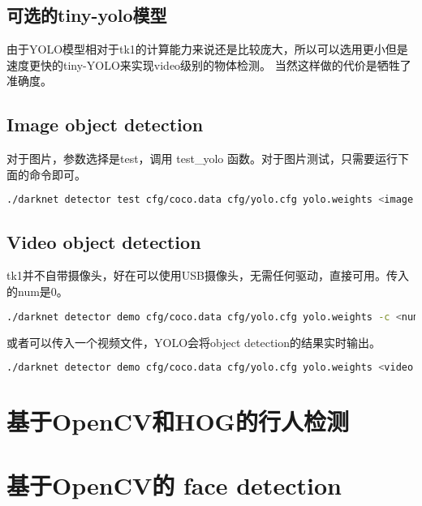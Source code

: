 \documentclass[openany]{ctexbook}
\newcommand{\info}[1] {\fcolorbox{blue!20}{blue!20} {\color{blue} #1}}
\begin{document}
\subsection{可选的tiny-yolo模型}
由于YOLO模型相对于tk1的计算能力来说还是比较庞大，所以可以选用更小但是速度更快的tiny-YOLO来实现video级别的物体检测。
当然这样做的代价是牺牲了准确度。
\subsection{Image object detection}
对于图片，参数选择是test，调用\info{test\_yolo}
函数。对于图片测试，只需要运行下面的命令即可。
{\setmainfont{Courier New Bold}                          %
\begin{lstlisting}[language=bash]
./darknet detector test cfg/coco.data cfg/yolo.cfg yolo.weights <image path>
\end{lstlisting}}
\subsection{Video object detection}
tk1并不自带摄像头，好在可以使用USB摄像头，无需任何驱动，直接可用。传入的num是0。
{\setmainfont{Courier New Bold}                          %
\begin{lstlisting}[language=bash]
./darknet detector demo cfg/coco.data cfg/yolo.cfg yolo.weights -c <num>
\end{lstlisting}}
或者可以传入一个视频文件，YOLO会将object detection的结果实时输出。
{\setmainfont{Courier New Bold}                          %
\begin{lstlisting}[language=bash]
./darknet detector demo cfg/coco.data cfg/yolo.cfg yolo.weights <video file>
\end{lstlisting}}
\section{基于OpenCV和HOG的行人检测}
\section{基于OpenCV的 face detection}
\end{document}
